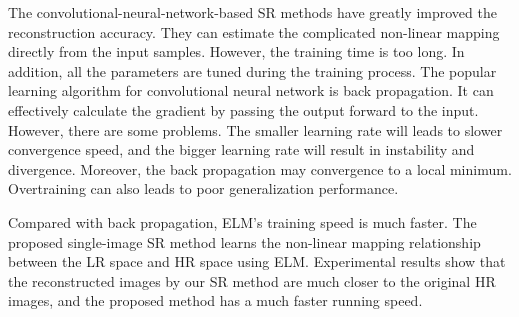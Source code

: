 \documentclass[review,numbers,sort&compress]{elsarticle}  %
\begin{document}
The convolutional-neural-network-based SR methods have greatly improved the reconstruction accuracy. They can estimate the complicated non-linear mapping directly from the input samples. However, the training time is too long. In addition, all the parameters are tuned during the training process. The popular learning algorithm for convolutional neural network is back propagation. It can effectively calculate the gradient by passing the output forward to the input. However, there are some problems. The smaller learning rate will leads to slower convergence speed, and the bigger learning rate will result in instability and divergence. Moreover, the back propagation may convergence to a local minimum. Overtraining can also leads to poor generalization performance.

Compared with back propagation, ELM’s training speed is much faster. The proposed single-image SR method learns the non-linear mapping relationship between the LR space and HR space using ELM. Experimental results show that the reconstructed images by our SR method are much closer to the original HR images, and the proposed method has a much faster running speed.


\end{document}
